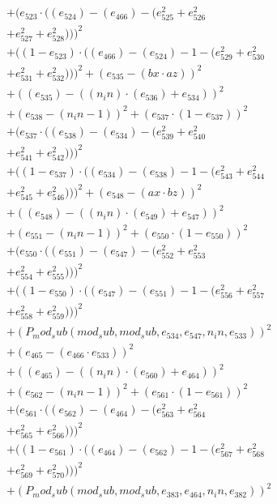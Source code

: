 \documentclass[10pt, a4paper]{article}
\begin{document}
\begin{small}
\begin{align*}
& + (e_{523}  \cdot  ((e_{524}) - (e_{466}) - (e_{525}^{2} + e_{526}^{2} \\
& + e_{527}^{2} + e_{528}^{2})))^{2} \\
& + ((1 - e_{523})  \cdot  ((e_{466}) - (e_{524}) - 1 - (e_{529}^{2} + e_{530}^{2} \\
& + e_{531}^{2} + e_{532}^{2})))^{2} + (e_{535} - (bx  \cdot  az))^{2} \\
& + ((e_{535}) - ((n_in)  \cdot  (e_{536}) + e_{534}))^{2} \\
& + (e_{538} - (n_in - 1))^{2} + (e_{537}  \cdot  (1 - e_{537}))^{2} \\
& + (e_{537}  \cdot  ((e_{538}) - (e_{534}) - (e_{539}^{2} + e_{540}^{2} \\
& + e_{541}^{2} + e_{542}^{2})))^{2} \\
& + ((1 - e_{537})  \cdot  ((e_{534}) - (e_{538}) - 1 - (e_{543}^{2} + e_{544}^{2} \\
& + e_{545}^{2} + e_{546}^{2})))^{2} + (e_{548} - (ax  \cdot  bz))^{2} \\
& + ((e_{548}) - ((n_in)  \cdot  (e_{549}) + e_{547}))^{2} \\
& + (e_{551} - (n_in - 1))^{2} + (e_{550}  \cdot  (1 - e_{550}))^{2} \\
& + (e_{550}  \cdot  ((e_{551}) - (e_{547}) - (e_{552}^{2} + e_{553}^{2} \\
& + e_{554}^{2} + e_{555}^{2})))^{2} \\
& + ((1 - e_{550})  \cdot  ((e_{547}) - (e_{551}) - 1 - (e_{556}^{2} + e_{557}^{2} \\
& + e_{558}^{2} + e_{559}^{2})))^{2} \\
& + (P_mod_sub(mod_sub, mod_sub, e_{534}, e_{547}, n_in, e_{533}))^{2} \\
& + (e_{465} - (e_{466}  \cdot  e_{533}))^{2} \\
& + ((e_{465}) - ((n_in)  \cdot  (e_{560}) + e_{464}))^{2} \\
& + (e_{562} - (n_in - 1))^{2} + (e_{561}  \cdot  (1 - e_{561}))^{2} \\
& + (e_{561}  \cdot  ((e_{562}) - (e_{464}) - (e_{563}^{2} + e_{564}^{2} \\
& + e_{565}^{2} + e_{566}^{2})))^{2} \\
& + ((1 - e_{561})  \cdot  ((e_{464}) - (e_{562}) - 1 - (e_{567}^{2} + e_{568}^{2} \\
& + e_{569}^{2} + e_{570}^{2})))^{2} \\
& + (P_mod_sub(mod_sub, mod_sub, e_{383}, e_{464}, n_in, e_{382}))^{2} \\

\end{align*}
\end{small}
\end{document}

